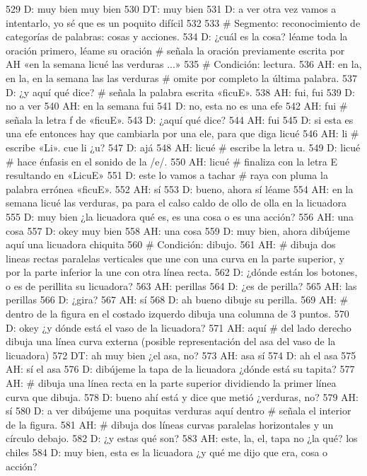 529 D: muy bien muy bien
530 DT: muy bien
531 D: a ver otra vez vamos a intentarlo, yo sé que es un poquito difícil
532 
533 # Segmento: reconocimiento de categorías de palabras: cosas y acciones.
534 D: ¿cuál es la cosa? léame toda la oración primero, léame su oración # señala la oración previamente escrita por AH «en la semana licué las verduras ...» 
535 # Condición: lectura.
536 AH: en la, en la, en la semana las las verduras # omite por completo la última palabra.
537 D: ¿y aquí qué dice? # señala la palabra escrita «ficuE».
538 AH: fui, fui
539 D: no a ver
540 AH: en la semana fui
541 D: no, esta no es una efe
542 AH: fui # señala la letra f de «ficuE».
543 D: ¿aquí qué dice?
544 AH: fui
545 D: si esta es una efe entonces hay que cambiarla por una ele, para que diga licué
546 AH: li # escribe «Li». cue li ¿u?
547 D: ajá
548 AH: licué # escribe la letra u.
549 D: licué # hace énfasis en el sonido de la /e/.
550 AH: licué # finaliza con la letra E resultando en «LicuE»
551 D: este lo vamos a tachar # raya con pluma la palabra errónea «ficuE».
552 AH: sí
553 D: bueno, ahora sí léame
554 AH: en la semana licué las verduras, pa para el calso caldo de ollo de olla en la licuadora
555 D: muy bien ¿la licuadora qué es, es una cosa o es una acción?
556 AH: una cosa
557 D: okey muy bien
558 AH: una cosa
559 D: muy bien, ahora dibújeme aquí una licuadora chiquita
560 # Condición: dibujo.
561 AH: # dibuja dos lineas rectas paralelas verticales que une con una curva en la parte superior, y por la parte inferior la une con otra línea recta.
562 D: ¿dónde están los botones, o es de perillita su licuadora?
563 AH: perillas
564 D: ¿es de perilla?
565 AH: las perillas
566 D: ¿gira?
567 AH: sí
568 D: ah bueno dibuje su perilla.
569 AH: # dentro de la figura en el costado izquerdo dibuja una columna de 3 puntos.
570 D: okey ¿y dónde está el vaso de la licuadora?
571 AH: aquí # del lado derecho dibuja una línea curva externa (posible representación del asa del vaso de la licuadora)
572 DT: ah muy bien ¿el asa, no?
573 AH: asa sí
574 D: ah el asa
575 AH: sí el asa
576 D: dibújeme la tapa de la licuadora ¿dónde está su tapita?
577 AH: # dibuja una línea recta en la parte superior dividiendo la primer línea curva que dibuja.
578 D: bueno ahí está y dice que metió ¿verduras, no?
579 AH: sí
580 D: a ver dibújeme una poquitas verduras aquí dentro # señala el interior de la figura.
581 AH: # dibuja dos líneas curvas paralelas horizontales y un círculo debajo.
582 D: ¿y estas qué son?
583 AH: este, la, el, tapa no ¿la qué? los chiles
584 D: muy bien, esta es la licuadora ¿y qué me dijo que era, cosa o acción?
